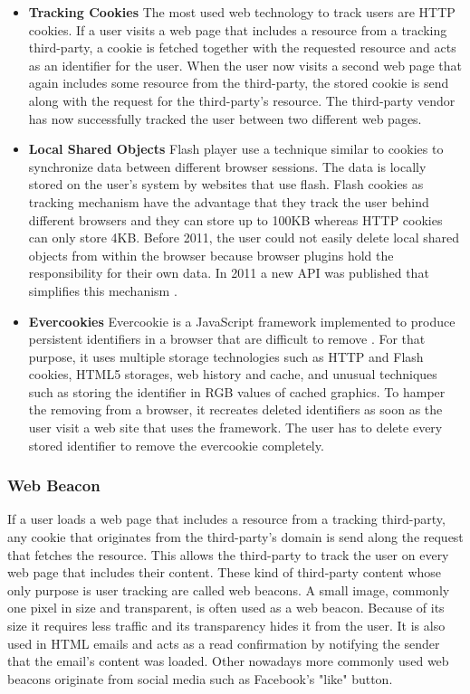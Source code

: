	\begin{itemize}
		\item \textbf{Tracking Cookies} The most used web technology to track users are HTTP cookies. If a user visits a web page that includes a resource from a tracking third-party, a cookie is fetched together with the requested resource and acts as an identifier for the user. When the user now visits a second web page that again includes some resource from the third-party, the stored cookie is send along with the request for the third-party's resource. The third-party vendor has now successfully tracked the user between two different web pages.  
		
		\item \textbf{Local Shared Objects} Flash player use a technique similar to cookies to synchronize data between different browser sessions. The data is locally stored on the user's system by websites that use flash. Flash cookies as tracking mechanism have the advantage that they track the user behind different browsers and they can store up to 100KB whereas HTTP cookies can only store 4KB. Before 2011, the user could not easily delete local shared objects from within the browser because browser plugins hold the responsibility for their own data. In 2011 a new API was published that simplifies this mechanism \cite{mozillaWikiClearPrivacyAPI}. %
		
		\item \textbf{Evercookies} Evercookie is a JavaScript framework implemented to produce persistent identifiers in a browser that are difficult to remove \cite{evercookie}. For that purpose, it uses multiple storage technologies such as HTTP and Flash cookies, HTML5 storages, web history and cache, and unusual techniques such as storing the identifier in RGB values of cached graphics. To hamper the removing from a browser, it recreates deleted identifiers as soon as the user visit a web site that uses the framework. The user has to delete every stored identifier to remove the evercookie completely. 
	\end{itemize}
	
\subsubsection{Web Beacon}
	
	If a user loads a web page that includes a resource from a tracking third-party, any cookie that originates from the third-party's domain is send along the request that fetches the resource. This allows the third-party to track the user on every web page that includes their content. These kind of third-party content whose only purpose is user tracking are called web beacons. A small image, commonly one pixel in size and transparent, is often used as a web beacon. Because of its size it requires less traffic and its transparency hides it from the user. It is also used in HTML emails and acts as a read confirmation by notifying the sender that the email's content was loaded. Other nowadays more commonly used web beacons originate from social media such as Facebook's "like" button. 
	
